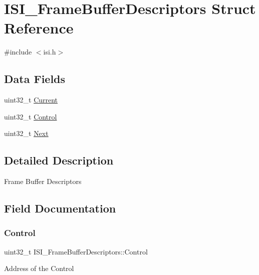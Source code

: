 \hypertarget{structISI__FrameBufferDescriptors}{}\section{I\+S\+I\+\_\+\+Frame\+Buffer\+Descriptors Struct Reference}
\label{structISI__FrameBufferDescriptors}


{\ttfamily \#include $<$isi.\+h$>$}

\subsection*{Data Fields}
\begin{DoxyCompactItemize}
\item 
uint32\+\_\+t \mbox{\hyperlink{structISI__FrameBufferDescriptors_ade5eb1d379338bde370fc8158340490b}{Current}}
\item 
uint32\+\_\+t \mbox{\hyperlink{structISI__FrameBufferDescriptors_ab962c9301dca2b86e652fd0c28b8a861}{Control}}
\item 
uint32\+\_\+t \mbox{\hyperlink{structISI__FrameBufferDescriptors_a36f356786e6d04f5eb34c7240cfe4300}{Next}}
\end{DoxyCompactItemize}


\subsection{Detailed Description}
Frame Buffer Descriptors 

\subsection{Field Documentation}
\mbox{\label{structISI__FrameBufferDescriptors_ab962c9301dca2b86e652fd0c28b8a861}} 
\subsubsection{\texorpdfstring{Control}{Control}}
{\footnotesize\ttfamily uint32\+\_\+t I\+S\+I\+\_\+\+Frame\+Buffer\+Descriptors\+::\+Control}

Address of the Control \mbox{\label{structISI__FrameBufferDescriptors_ade5eb1d379338bde370fc8158340490b}} 
